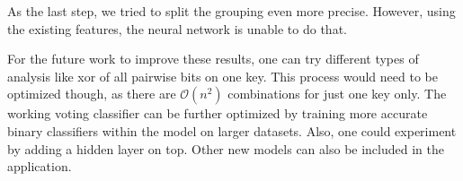 As the last step, we tried to split the grouping even more precise. However, using the existing features, the neural network is unable to do that. 

For the future work to improve these results, one can try different types of analysis like xor of all pairwise bits on one key. This process would need to be optimized though, as there are $\mathcal{O}(n^2)$ combinations for just one key only. The working voting classifier can be further optimized by training more accurate binary classifiers within the model on larger datasets. Also, one could experiment by adding a hidden layer on top. Other new models can also be included in the application.
